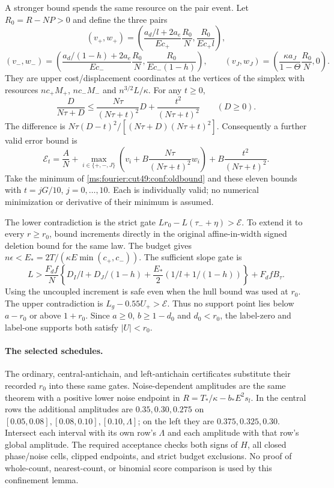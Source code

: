 A stronger bound spends the same resource on the pair event. Let
$R_0=R-NP>0$ and define the three pairs
\[
 (v_+,w_+)=\left(\frac{a_d/l+2a_e}{Ec_+}\frac{R_0}{N},
                    \frac{R_0}{Ec_+l}\right),
\]
\[
 (v_-,w_-)=\left(\frac{a_d/(1-h)+2a_e}{Ec_-}\frac{R_0}{N},
                    \frac{R_0}{Ec_-(1-h)}\right),\qquad
 (v_J,w_J)=\left(\frac{\kappa a_J}{1-\Theta}\frac{R_0}{N},0\right).
\]
They are upper cost/displacement coordinates at the vertices of the
simplex with resources $nc_+M_+$, $nc_-M_-$ and $n^{3/2}L/\kappa$.
For any $t\ge0$,
\[
 \frac{D}{N\tau+D}\le\frac{N\tau}{(N\tau+t)^2}D+
 \frac{t^2}{(N\tau+t)^2}\qquad(D\ge0).
\]
The difference is $N\tau(D-t)^2/[(N\tau+D)(N\tau+t)^2]$.
Consequently a further valid error bound is
\[
 \mathcal E_t=\frac AN+
 \max_{i\in\{+,-,J\}}\left(v_i+B\frac{N\tau}{(N\tau+t)^2}w_i\right)
 +B\frac{t^2}{(N\tau+t)^2}.
\]
Take the minimum of \eqref{ms:fourier:cut49:conf:oldbound} and these eleven
bounds with $t=jG/10$, $j=0,\ldots,10$. Each is individually valid;
no numerical minimization or derivative of their minimum is assumed.

The lower contradiction is the strict gate
$Lr_0-L(\tau_-+\eta)>\mathcal E$.
To extend it to every $r\ge r_0$, bound increments directly in the original
affine-in-width signed deletion bound for the same law. The budget gives
$n\epsilon<E_*=2T/(\kappa E\min(c_+,c_-))$. The sufficient slope gate is
\[
 L>\frac{F_df}{N}\left\{D_I/l+D_J/(1-h)
 +\frac{E_*}{2}\left(1/l+1/(1-h)\right)\right\}+F_dfB_\tau.
\]
Using the uncoupled increment is safe even when the hull bound was used
at $r_0$. The upper contradiction is $L_g-0.55U_+>\mathcal E$.
Thus no support point lies below $a-r_0$ or above $1+r_0$.
Since $a\ge0$, $b\ge1-d_0$ and $d_0<r_0$, the label-zero and label-one
supports both satisfy $|U|<r_0$.

\paragraph{The selected schedules.}
The ordinary, central-antichain, and left-antichain certificates substitute
their recorded $r_0$ into these same gates. Noise-dependent amplitudes
are the same theorem with a positive lower noise endpoint in
$R=T_*/\kappa-b_*E^2s_l$. In the central rows the additional amplitudes
are $0.35,0.30,0.275$ on $[0.05,0.08],[0.08,0.10],[0.10,\Lambda]$;
on the left they are $0.375,0.325,0.30$. Intersect each interval with its
own row's $\Lambda$ and each amplitude with that row's global amplitude.
The required acceptance checks both signs of $H$, all closed phase/noise
cells, clipped endpoints, and strict budget exclusions. No proof of
whole-count, nearest-count, or binomial score comparison is used by this confinement lemma.

